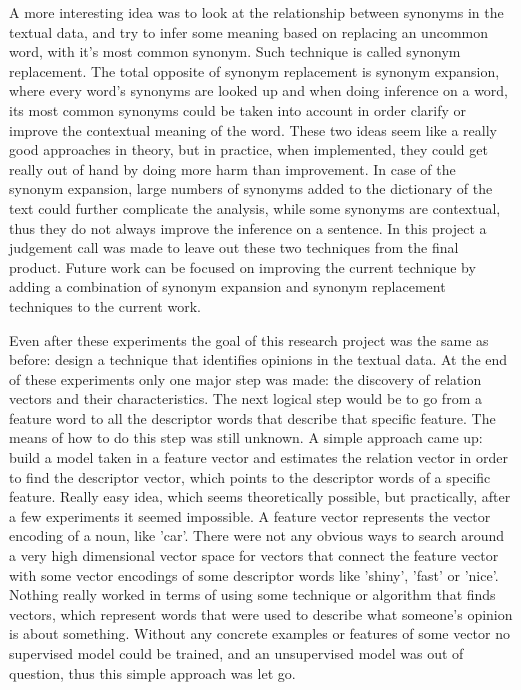 \documentclass{sig-alternate}
\begin{document}
A more interesting idea was to look at the relationship between synonyms in the textual data, and try to infer some meaning based on replacing an uncommon word, with it’s most common synonym. Such technique is called synonym replacement. The total opposite of synonym replacement is synonym expansion, where every word’s synonyms are looked up and when doing inference on a word, its most common synonyms could be taken into account in order clarify or improve the contextual meaning of the word. These two ideas seem like a really good approaches in theory, but in practice, when implemented, they could get really out of hand by doing more harm than improvement. In case of the synonym expansion, large numbers of synonyms added to the dictionary of the text could further complicate the analysis, while some synonyms are contextual, thus they do not always improve the inference on a sentence. In this project a judgement call was made to leave out these two techniques from the final product. Future work can be focused on improving the current technique by adding a combination of synonym expansion and synonym replacement techniques to the current work.

Even after these experiments the goal of this research project was the same as before: design a technique that identifies opinions in the textual data. At the end of these experiments only one major step was made: the discovery of relation vectors and their characteristics. The next logical step would be to go from a feature word to all the descriptor words that describe that specific feature. The means of how to do this step was still unknown. A simple approach came up: build a model taken in a feature vector and estimates the relation vector in order to find the descriptor vector, which points to the descriptor words of a specific feature. Really easy idea, which seems theoretically possible, but practically, after a few experiments it seemed impossible. A feature vector represents the vector encoding of a noun, like 'car'. There were not any obvious ways to search around a very high dimensional vector space for vectors that connect the feature vector with some vector encodings of some descriptor words like 'shiny', 'fast' or 'nice'. Nothing really worked in terms of using some technique or algorithm that finds vectors, which represent words that were used to describe what someone's opinion is about something. Without any concrete examples or features of some vector no supervised model could be trained, and an unsupervised model was out of question, thus this simple approach was let go. 
\end{document}
